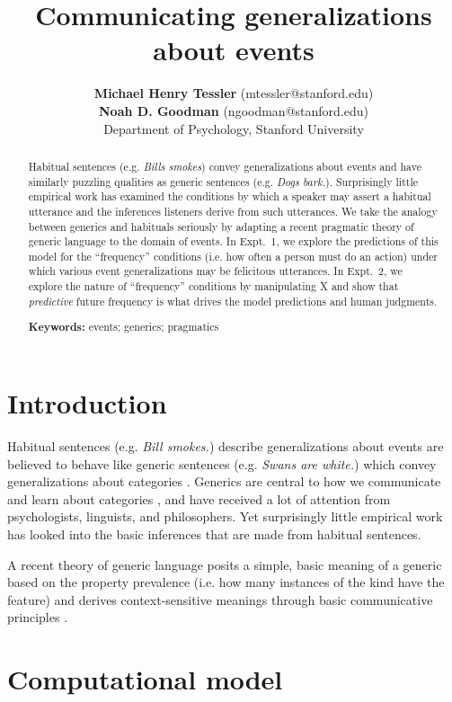 \documentclass[10pt,letterpaper]{article}
\title{Communicating generalizations about events}
\author{{\large \bf Michael Henry Tessler} (mtessler@stanford.edu) \\ {\large \bf Noah D. Goodman} (ngoodman@stanford.edu) \\
  Department of Psychology, Stanford University}
\begin{document}
\maketitle


\begin{abstract}
Habitual sentences (e.g. \emph{Bills smokes}) convey generalizations about events and have similarly puzzling qualities as generic sentences (e.g. \emph{Dogs bark.}). 
Surprisingly little empirical work has examined the conditions by which a speaker may assert a habitual utterance and the inferences listeners derive from such utterances.
We take the analogy between generics and habituals seriously by adapting a recent pragmatic theory of generic language to the domain of events.
In Expt.~1, we explore the predictions of this model for the ``frequency'' conditions (i.e. how often a person must do an action) under which various event generalizations may be felicitous utterances. 
In Expt.~2, we explore the nature of ``frequency'' conditions by manipulating X and show that \emph{predictive} future frequency is what drives the model predictions and human judgments. 

\textbf{Keywords:} 
events; generics; pragmatics
\end{abstract}


\section{Introduction}

Habitual sentences (e.g. \emph{Bill smokes.}) describe generalizations about events are believed to behave like generic sentences (e.g. \emph{Swans are white.}) which convey generalizations about categories \cite{Carlson2005}.
Generics are central to how we communicate and learn about categories \cite{Carlson1977, Gelman2004}, and have received a lot of attention from psychologists, linguists, and philosophers.
Yet surprisingly little empirical work has looked into the basic inferences that are made from habitual sentences.

A recent theory of generic language posits a simple, basic meaning of a generic based on the property prevalence (i.e. how many instances of the kind have the feature) and derives context-sensitive meanings through basic communicative principles \cite{TesslerUnderReview}.

\section{Computational model}
\end{document}
